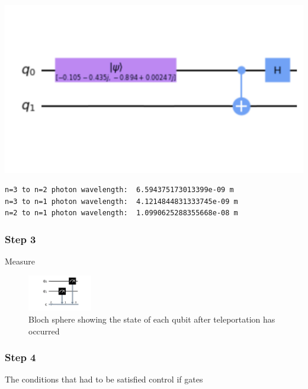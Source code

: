\begin{minipage}{0.45\textwidth}
    \centering
    \includegraphics[width=\textwidth]{lab3/images/Step2.png}
    
\end{minipage}
\hfill
\begin{minipage}{0.45\textwidth}
\begin{listing}
\begin{verbatim}
n=3 to n=2 photon wavelength:  6.594375173013399e-09 m
n=3 to n=1 photon wavelength:  4.1214844831333745e-09 m
n=2 to n=1 photon wavelength:  1.0990625288355668e-08 m
\end{verbatim}
\end{listing}
\end{minipage}
\subsubsection{Step 3}
Measure

\begin{figure}[h]
    \centering
    \includegraphics[width=0.25\textwidth]{lab3/images/Step3.png}
    \caption{Bloch sphere showing the state of each qubit after teleportation has occurred}
    \label{fig:step3}
\end{figure}

\subsubsection{Step 4}
The conditions that had to be satisfied
control if gates

